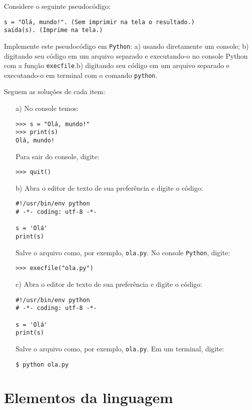 \begin{ex}
  Considere o seguinte pseudocódigo:
\begin{verbatim}
s = "Olá, mundo!". (Sem imprimir na tela o resultado.)
saída(s). (Imprime na tela.)
\end{verbatim}
Implemente este pseudocódigo em \verb+Python+: a) usando diretamente um console; b) digitando seu código em um arquivo separado e executando-o no console Python com a função \verb+execfile+.b) digitando seu código em um arquivo separado e executando-o em terminal com o comando \verb+python+.
\end{ex}
\begin{sol} Seguem as soluções de cada item:
  \begin{itemize}
  \item[a)]  No console temos:
\begin{verbatim}
>>> s = "Olá, mundo!"
>>> print(s)
Olá, mundo!
\end{verbatim}
Para sair do console, digite:
\begin{verbatim}
>>> quit()
\end{verbatim}
  \item[b)] Abra o editor de texto de sua preferência e digite o código:
\begin{verbatim}
#!/usr/bin/env python
# -*- coding: utf-8 -*-

s = 'Olá'
print(s)
\end{verbatim}
Salve o arquivo como, por exemplo, \verb+ola.py+. No console \verb+Python+, digite:
\begin{verbatim}
>>> execfile("ola.py")
\end{verbatim}
  \item[c)] Abra o editor de texto de sua preferência e digite o código:
\begin{verbatim}
#!/usr/bin/env python
# -*- coding: utf-8 -*-

s = 'Olá'
print(s)
\end{verbatim}
Salve o arquivo como, por exemplo, \verb+ola.py+. Em um terminal, digite:
\begin{verbatim}
$ python ola.py
\end{verbatim}
\end{itemize}
\end{sol}

\section{Elementos da linguagem}


